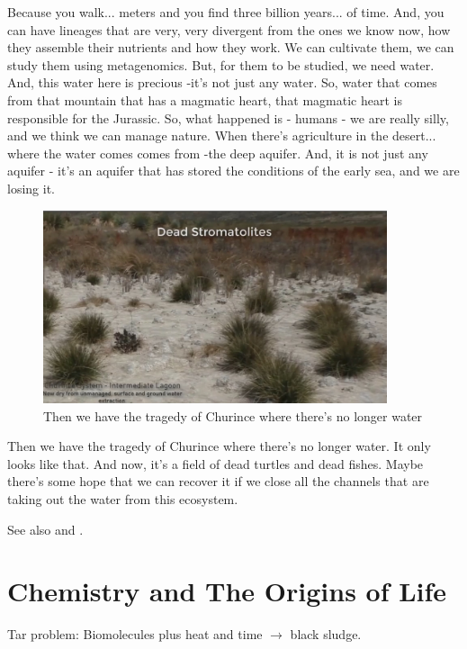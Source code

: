 \documentclass[]{article}
\begin{document}
Because you walk... meters and you find three billion years... of time. And, you can have lineages that are very, very divergent from the ones we know now, how they assemble their nutrients and how they work. We can cultivate them, we can study them using metagenomics. But, for them to be studied, we need water. And, this water here is precious -it's not just any water. So, water that comes from that mountain that has a magmatic heart, that magmatic heart is responsible for the Jurassic. So, what happened is - humans - we are really silly, and we think we can manage nature. When there's agriculture in the desert... where the water comes comes from -the deep aquifer. And, it is not just any aquifer - it's an aquifer that has stored the conditions of the early sea, and we are losing it.

\begin{figure}[H]
	\caption[The tragedy of Churince where there's no longer water]{Then we have the tragedy of Churince where there's no longer water} 
	\includegraphics[width=0.9\textwidth]{CuatroCienegas11}
\end{figure}

Then we have the tragedy of Churince where there's no longer water. It only looks like that. And now, it's a field of dead turtles and dead fishes. Maybe there's some hope that we can recover it if we close all the channels that are taking out the water from this ecosystem.

See also \cite{gomez2018leptolyngbya} and \cite{taboada2018geographic}.

\section{Chemistry and The Origins of Life}

Tar problem: Biomolecules plus heat and time $\rightarrow$ black sludge.
\end{document}
